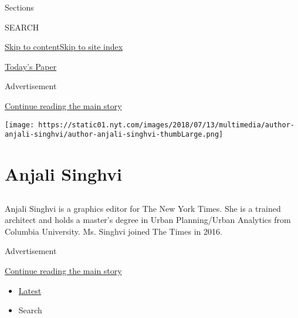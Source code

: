Sections

SEARCH

\protect\hyperlink{site-content}{Skip to
content}\protect\hyperlink{site-index}{Skip to site index}

\href{https://myaccount.nytimes.com/auth/login?response_type=cookie\&client_id=vi}{}

\href{https://www.nytimes.com/section/todayspaper}{Today's Paper}

Advertisement

\protect\hyperlink{after-top}{Continue reading the main story}

\texttt{[image: https://static01.nyt.com/images/2018/07/13/multimedia/author-anjali-singhvi/author-anjali-singhvi-thumbLarge.png]}

\hypertarget{anjali-singhvi}{%
\section{Anjali Singhvi}\label{anjali-singhvi}}

\subsection{}

Anjali Singhvi is a graphics editor for The New York Times. She is a
trained architect and holds a master's degree in Urban Planning/Urban
Analytics from Columbia University. Ms. Singhvi joined The Times in
2016.

Advertisement

\protect\hyperlink{after-mid1}{Continue reading the main story}

\begin{itemize}
\tightlist
\item
  \protect\hyperlink{stream-panel}{Latest}
\item
  Search
\end{itemize}


